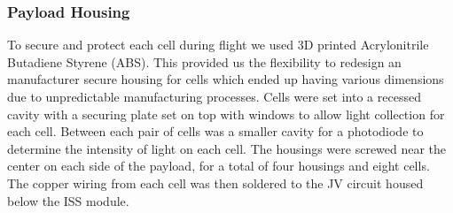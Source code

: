 \subsubsection{Payload Housing}

To secure and protect each cell during flight we used 3D printed Acrylonitrile Butadiene Styrene (ABS). This provided us the flexibility to redesign an manufacturer secure housing for cells which ended up having various dimensions due to unpredictable manufacturing processes. Cells were set into a recessed cavity with a securing plate set on top with windows to allow light collection for each cell. Between each pair of cells was a smaller cavity for a photodiode to determine the intensity of light on each cell. The housings were screwed near the center on each side of the payload, for a total of four housings and eight cells. The copper wiring from each cell was then soldered to the JV circuit housed below the ISS module.
